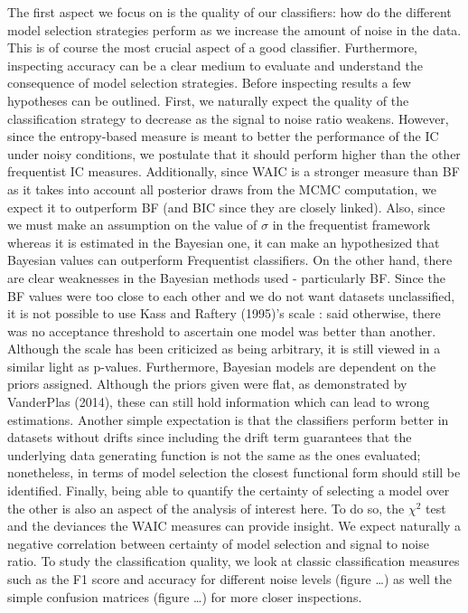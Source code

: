 \documentclass[]{article}
\begin{document}
The first aspect we focus on is the quality of our classifiers: how do
the different model selection strategies perform as we increase the
amount of noise in the data. This is of course the most crucial aspect
of a good classifier. Furthermore, inspecting accuracy can be a clear
medium to evaluate and understand the consequence of model selection
strategies. Before inspecting results a few hypotheses can be outlined.
First, we naturally expect the quality of the classification strategy to
decrease as the signal to noise ratio weakens. However, since the
entropy-based measure is meant to better the performance of the IC under
noisy conditions, we postulate that it should perform higher than the
other frequentist IC measures. Additionally, since WAIC is a stronger
measure than BF as it takes into account all posterior draws from the
MCMC computation, we expect it to outperform BF (and BIC since they are
closely linked). Also, since we must make an assumption on the value of
\(\sigma\) in the frequentist framework whereas it is estimated in the
Bayesian one, it can make an hypothesized that Bayesian values can
outperform Frequentist classifiers. On the other hand, there are clear
weaknesses in the Bayesian methods used - particularly BF. Since the BF
values were too close to each other and we do not want datasets
unclassified, it is not possible to use Kass and Raftery (1995)'s scale
: said otherwise, there was no acceptance threshold to ascertain one
model was better than another. Although the scale has been criticized as
being arbitrary, it is still viewed in a similar light as p-values.
Furthermore, Bayesian models are dependent on the priors assigned.
Although the priors given were flat, as demonstrated by VanderPlas
(2014), these can still hold information which can lead to wrong
estimations. Another simple expectation is that the classifiers perform
better in datasets without drifts since including the drift term
guarantees that the underlying data generating function is not the same
as the ones evaluated; nonetheless, in terms of model selection the
closest functional form should still be identified. Finally, being able
to quantify the certainty of selecting a model over the other is also an
aspect of the analysis of interest here. To do so, the \(\chi^2\) test
and the deviances the WAIC measures can provide insight. We expect
naturally a negative correlation between certainty of model selection
and signal to noise ratio. To study the classification quality, we look
at classic classification measures such as the F1 score and accuracy for
different noise levels (figure \ldots{}) as well the simple confusion
matrices (figure \ldots{}) for more closer inspections.
\end{document}
